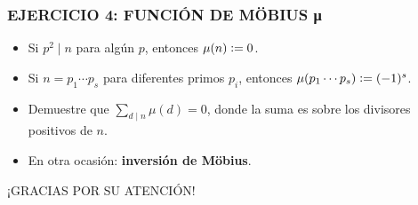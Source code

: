 \begin{frame}
  \frametitle{EJERCICIO 4: FUNCIÓN DE MÖBIUS μ}

  \begin{itemize}
  \item<2-> Si $p^2 \mid n$ para algún $p$, entonces $\mu (n) \mathrel{\mathop:}= 0$.

  \item<3-> Si $n = p_1\cdots p_s$ para diferentes primos $p_i$, entonces
    $\mu (p_1\cdots p_s) \mathrel{\mathop:}= (-1)^s$.

  \item<4-> Demuestre que
    $\sum_{d\mid n} \mu (d) = 0$,
    donde la suma es sobre los divisores positivos de $n$.


  \item<6-> En otra ocasión: \textbf{inversión de Möbius}.
  \end{itemize}
\end{frame}

\begin{frame}

  \vfill

  \begin{center}\huge\headingfont
    ¡GRACIAS POR SU ATENCIÓN!
  \end{center}

  \vfill
\end{frame}

